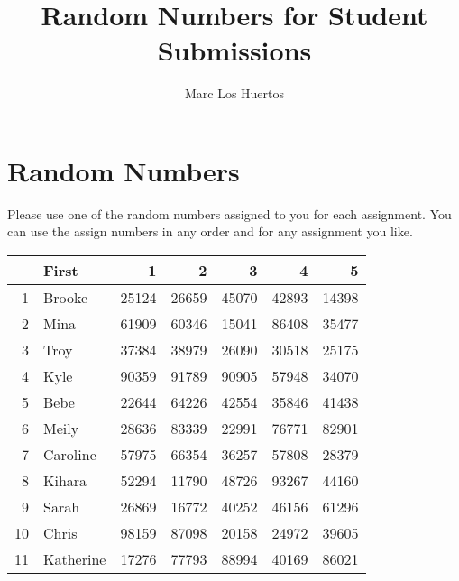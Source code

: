 \documentclass{article}\usepackage[]{graphicx}\usepackage[]{color}
\title{Random Numbers for Student Submissions}
\author{Marc Los Huertos}
\begin{document}
\maketitle


\section*{Random Numbers}

Please use one of the random numbers assigned to you for each assignment. You can use the assign numbers in any order and for any assignment you like. 

\begin{table}[ht]
\centering
\begin{tabular}{rlrrrrr}
  \hline
 & First & 1 & 2 & 3 & 4 & 5 \\ 
  \hline
1 & Brooke & 25124 & 26659 & 45070 & 42893 & 14398 \\ 
  2 & Mina & 61909 & 60346 & 15041 & 86408 & 35477 \\ 
  3 & Troy & 37384 & 38979 & 26090 & 30518 & 25175 \\ 
  4 & Kyle & 90359 & 91789 & 90905 & 57948 & 34070 \\ 
  5 & Bebe & 22644 & 64226 & 42554 & 35846 & 41438 \\ 
  6 & Meily & 28636 & 83339 & 22991 & 76771 & 82901 \\ 
  7 & Caroline & 57975 & 66354 & 36257 & 57808 & 28379 \\ 
  8 & Kihara & 52294 & 11790 & 48726 & 93267 & 44160 \\ 
  9 & Sarah & 26869 & 16772 & 40252 & 46156 & 61296 \\ 
  10 & Chris & 98159 & 87098 & 20158 & 24972 & 39605 \\ 
  11 & Katherine & 17276 & 77793 & 88994 & 40169 & 86021 \\ 
   \hline
\end{tabular}
\end{table}
\end{document}
